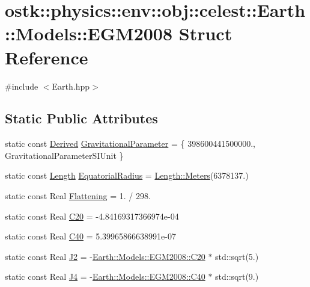 \hypertarget{structostk_1_1physics_1_1env_1_1obj_1_1celest_1_1_earth_1_1_models_1_1_e_g_m2008}{}\section{ostk\+:\+:physics\+:\+:env\+:\+:obj\+:\+:celest\+:\+:Earth\+:\+:Models\+:\+:E\+G\+M2008 Struct Reference}
\label{structostk_1_1physics_1_1env_1_1obj_1_1celest_1_1_earth_1_1_models_1_1_e_g_m2008}


{\ttfamily \#include $<$Earth.\+hpp$>$}

\subsection*{Static Public Attributes}
\begin{DoxyCompactItemize}
\item 
static const \hyperlink{classostk_1_1physics_1_1units_1_1_derived}{Derived} \hyperlink{structostk_1_1physics_1_1env_1_1obj_1_1celest_1_1_earth_1_1_models_1_1_e_g_m2008_a8394121b23869f652327020d5fbe52f2}{Gravitational\+Parameter} = \{ 398600441500000., Gravitational\+Parameter\+S\+I\+Unit \}
\item 
static const \hyperlink{classostk_1_1physics_1_1units_1_1_length}{Length} \hyperlink{structostk_1_1physics_1_1env_1_1obj_1_1celest_1_1_earth_1_1_models_1_1_e_g_m2008_aeaa20c721a95aae876511d40775ee33f}{Equatorial\+Radius} = \hyperlink{classostk_1_1physics_1_1units_1_1_length_ad227977ce00756791595796a0dd5ddd7}{Length\+::\+Meters}(6378137.)
\item 
static const Real \hyperlink{structostk_1_1physics_1_1env_1_1obj_1_1celest_1_1_earth_1_1_models_1_1_e_g_m2008_a6ed7cbe4ce3546964d454bac1829f50c}{Flattening} = 1. / 298.
\item 
static const Real \hyperlink{structostk_1_1physics_1_1env_1_1obj_1_1celest_1_1_earth_1_1_models_1_1_e_g_m2008_a0f6ab7acf82079be89804e6b0eb28482}{C20} = -\/4.\+84169317366974e-\/04
\item 
static const Real \hyperlink{structostk_1_1physics_1_1env_1_1obj_1_1celest_1_1_earth_1_1_models_1_1_e_g_m2008_ac5e96adc83d88ad825d4392dc37d7dc7}{C40} = 5.\+39965866638991e-\/07
\item 
static const Real \hyperlink{structostk_1_1physics_1_1env_1_1obj_1_1celest_1_1_earth_1_1_models_1_1_e_g_m2008_a997d91f4530dc39664b7795868754382}{J2} = -\/\hyperlink{structostk_1_1physics_1_1env_1_1obj_1_1celest_1_1_earth_1_1_models_1_1_e_g_m2008_a0f6ab7acf82079be89804e6b0eb28482}{Earth\+::\+Models\+::\+E\+G\+M2008\+::\+C20} $\ast$ std\+::sqrt(5.)
\item 
static const Real \hyperlink{structostk_1_1physics_1_1env_1_1obj_1_1celest_1_1_earth_1_1_models_1_1_e_g_m2008_a8baff2cdb9ed283e36a67a393870e2d8}{J4} = -\/\hyperlink{structostk_1_1physics_1_1env_1_1obj_1_1celest_1_1_earth_1_1_models_1_1_e_g_m2008_ac5e96adc83d88ad825d4392dc37d7dc7}{Earth\+::\+Models\+::\+E\+G\+M2008\+::\+C40} $\ast$ std\+::sqrt(9.)
\end{DoxyCompactItemize}


